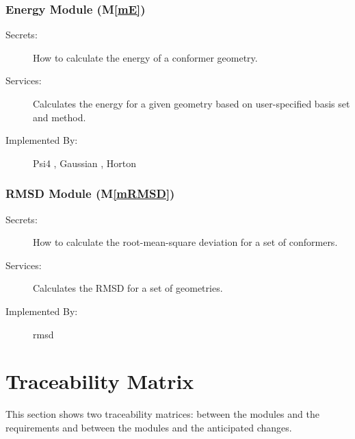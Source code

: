 \documentclass[12pt, titlepage]{article}
\newcommand{\mref}[1]{M\ref{#1}}
\begin{document}
\subsubsection{Energy Module (\mref{mE})}
\begin{description}
	\item[Secrets:] How to calculate the energy of a conformer geometry.
	\item[Services:] Calculates the energy for a given geometry based on 
	user-specified basis set and method. 
	\item[Implemented By:] Psi4 \citet{psi4}, Gaussian \citet{g16}, 
	Horton \citet{horton}
\end{description}

\subsubsection{RMSD Module (\mref{mRMSD})}
\begin{description}
	\item[Secrets:] How to calculate the root-mean-square deviation for a set 
	of conformers.
	\item[Services:] Calculates the RMSD for a set of geometries.
	\item[Implemented By:] rmsd\citet{rmsd-charnley}
\end{description}


\section{Traceability Matrix} \label{SecTM}

This section shows two traceability matrices: between the modules and the
requirements and between the modules and the anticipated changes.
\end{document}
